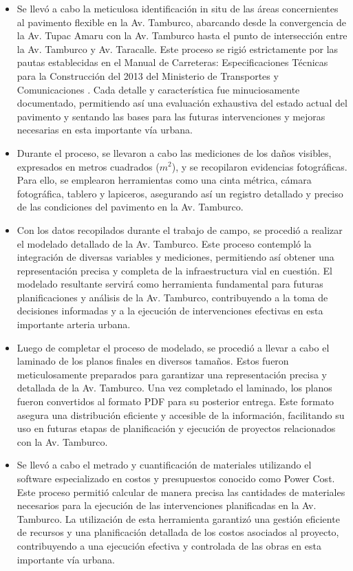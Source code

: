 \begin{itemize}
	\item Se llevó a cabo la meticulosa identificación in situ de las áreas concernientes al pavimento flexible en la Av. Tamburco, abarcando desde la convergencia de la Av. Tupac Amaru con la Av. Tamburco hasta el punto de intersección entre la Av. Tamburco y Av. Taracalle. Este proceso se rigió estrictamente por las pautas establecidas en el Manual de Carreteras: Especificaciones Técnicas para la Construcción del 2013 del Ministerio de Transportes y Comunicaciones \cite{MTC2013}. Cada detalle y característica fue minuciosamente documentado, permitiendo así una evaluación exhaustiva del estado actual del pavimento y sentando las bases para las futuras intervenciones y mejoras necesarias en esta importante vía urbana.
	\item Durante el proceso, se llevaron a cabo las mediciones de los daños visibles, expresados en metros cuadrados ($m^{2}$), y se recopilaron evidencias fotográficas. Para ello, se emplearon herramientas como una cinta métrica, cámara fotográfica, tablero y lapiceros, asegurando así un registro detallado y preciso de las condiciones del pavimento en la Av. Tamburco.
	\item Con los datos recopilados durante el trabajo de campo, se procedió a realizar el modelado detallado de la Av. Tamburco. Este proceso contempló la integración de diversas variables y mediciones, permitiendo así obtener una representación precisa y completa de la infraestructura vial en cuestión. El modelado resultante servirá como herramienta fundamental para futuras planificaciones y análisis de la Av. Tamburco, contribuyendo a la toma de decisiones informadas y a la ejecución de intervenciones efectivas en esta importante arteria urbana.
	\item Luego de completar el proceso de modelado, se procedió a llevar a cabo el laminado de los planos finales en diversos tamaños. Estos fueron meticulosamente preparados para garantizar una representación precisa y detallada de la Av. Tamburco. Una vez completado el laminado, los planos fueron convertidos al formato PDF para su posterior entrega. Este formato asegura una distribución eficiente y accesible de la información, facilitando su uso en futuras etapas de planificación y ejecución de proyectos relacionados con la Av. Tamburco.
	\item Se llevó a cabo el metrado y cuantificación de materiales utilizando el software especializado en costos y presupuestos conocido como Power Cost. Este proceso permitió calcular de manera precisa las cantidades de materiales necesarios para la ejecución de las intervenciones planificadas en la Av. Tamburco. La utilización de esta herramienta garantizó una gestión eficiente de recursos y una planificación detallada de los costos asociados al proyecto, contribuyendo a una ejecución efectiva y controlada de las obras en esta importante vía urbana.

\end{itemize}
